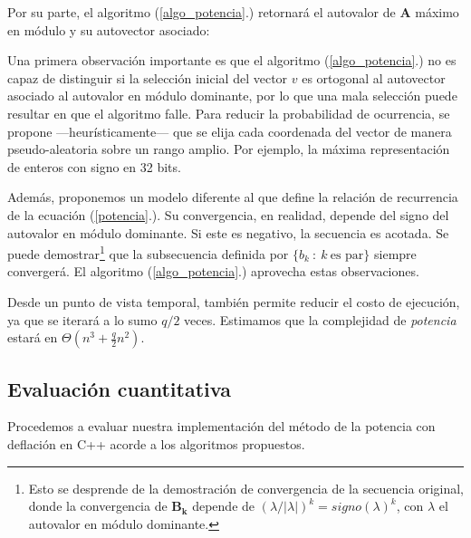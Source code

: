 \vspace{2em}
\noindent Por su parte, el algoritmo (\ref{algo_potencia}.) retornará el autovalor de \textbf{A} máximo en módulo y su autovector asociado:

\vspace{1em}


\vspace{1em}
Una primera observación importante es que el algoritmo (\ref{algo_potencia}.) no es capaz de distinguir si la selección inicial del vector $v$ es ortogonal al autovector asociado al autovalor en módulo dominante, por lo que una mala selección puede resultar en que el algoritmo falle. Para reducir la probabilidad de ocurrencia, se propone ---heurísticamente--- que se elija cada coordenada del vector de manera pseudo-aleatoria sobre un rango amplio. Por ejemplo, la máxima representación de enteros con signo en 32 bits.

\vspace{1em}
Además, proponemos un modelo diferente al que define la relación de recurrencia de la ecuación (\ref{potencia}.). Su convergencia, en realidad, depende del signo del autovalor en módulo dominante. Si este es negativo, la secuencia es acotada. Se puede demostrar\footnote{Esto se desprende de la demostración de convergencia de la secuencia original, donde la convergencia de $\mathbf{B_k}$ depende de $(\lambda/|\lambda|)^k = signo(\lambda)^k$, con $\lambda$ el autovalor en módulo dominante.} que la subsecuencia definida por $\{b_k\ :\ k\ \text{es par}\}$ siempre convergerá. El algoritmo (\ref{algo_potencia}.) aprovecha estas observaciones. 

Desde un punto de vista temporal, también permite reducir el costo de ejecución, ya que se iterará a lo sumo $q / 2$ veces. Estimamos que la complejidad de \textit{potencia} estará en $\Theta(n^3 + \frac{q}{2} n^2)$.  





\vspace{2em}
\subsection{Evaluación cuantitativa} Procedemos a evaluar nuestra implementación del método de la potencia con deflación en C++ acorde a los algoritmos propuestos.

